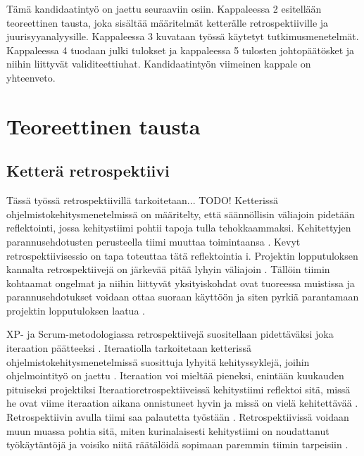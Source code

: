 Tämä kandidaatintyö on jaettu seuraaviin osiin. Kappaleessa 2 esitellään teoreettinen tausta, joka sisältää määritelmät ketterälle retrospektiiville ja juurisyyanalyysille. Kappaleessa 3 kuvataan työssä käytetyt tutkimusmenetelmät. Kappaleessa 4 tuodaan julki tulokset ja kappaleessa 5 tulosten johtopäätösket ja niihin liittyvät validiteettiuhat. Kandidaatintyön viimeinen kappale on yhteenveto.

\section{Teoreettinen tausta}

\subsection{Ketterä retrospektiivi}
Tässä työssä retrospektiivillä tarkoitetaan... TODO!
Ketterissä ohjelmistokehitysmenetelmissä on määritelty, että säännöllisin väliajoin pidetään reflektointi, jossa kehitystiimi pohtii tapoja tulla tehokkaammaksi. Kehitettyjen parannusehdotusten perusteella tiimi muuttaa toimintaansa \citep{AgileManifestoPrinciples}. Kevyt retrospektiivisessio on tapa toteuttaa tätä reflektointia \citep{Cockburn2002}i. Projektin lopputuloksen kannalta retrospektiivejä on järkevää pitää lyhyin väliajoin \citep{Cockburn2002}. Tällöin tiimin kohtaamat ongelmat ja niihin liittyvät yksityiskohdat ovat tuoreessa muistissa ja parannusehdotukset voidaan ottaa suoraan käyttöön ja siten pyrkiä parantamaan projektin lopputuloksen laatua \citep{Cockburn2002}.

XP- ja Scrum-metodologiassa retrospektiivejä suositellaan pidettäväksi joka iteraation päätteeksi \citep{Lindstrom2004, ScrumGuide2011}. Iteraatiolla tarkoitetaan ketterissä ohjelmistokehitysmenetelmissä suosittuja lyhyitä kehityssyklejä, joihin ohjelmointityö on jaettu \citep{beck1999embracing}. Iteraation voi mieltää pieneksi, enintään kuukauden pituiseksi projektiksi \citep{ScrumGuide2011}  Iteraatioretrospektiiveissä kehitystiimi reflektoi sitä, missä he ovat viime iteraation aikana onnistuneet hyvin ja missä on vielä kehitettävää \citep{Lindstrom2004, ScrumGuide2011}. Retrospektiivin avulla tiimi saa palautetta työstään \citep{Lindstrom2004}. Retrospektiivissä voidaan muun muassa pohtia sitä, miten kurinalaisesti kehitystiimi on noudattanut työkäytäntöjä ja voisiko niitä räätälöidä sopimaan paremmin tiimin tarpeisiin \citep{Lindstrom2004}.

